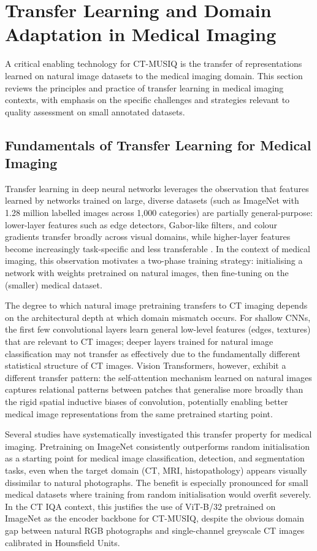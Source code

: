 \section{Transfer Learning and Domain Adaptation in Medical Imaging}
\label{sec:lit_transfer}

A critical enabling technology for CT-MUSIQ is the transfer of representations learned
on natural image datasets to the medical imaging domain. This section reviews the
principles and practice of transfer learning in medical imaging contexts, with emphasis
on the specific challenges and strategies relevant to quality assessment on small
annotated datasets.

\subsection{Fundamentals of Transfer Learning for Medical Imaging}

Transfer learning in deep neural networks leverages the observation that features learned
by networks trained on large, diverse datasets (such as ImageNet with 1.28 million
labelled images across 1,000 categories) are partially general-purpose: lower-layer
features such as edge detectors, Gabor-like filters, and colour gradients transfer broadly
across visual domains, while higher-layer features become increasingly task-specific and
less transferable \cite{goodfellow2016deep}. In the context of medical imaging, this
observation motivates a two-phase training strategy: initialising a network with
weights pretrained on natural images, then fine-tuning on the (smaller) medical dataset.

The degree to which natural image pretraining transfers to CT imaging depends on the
architectural depth at which domain mismatch occurs. For shallow CNNs, the first few
convolutional layers learn general low-level features (edges, textures) that are relevant
to CT images; deeper layers trained for natural image classification may not transfer
as effectively due to the fundamentally different statistical structure of CT images.
Vision Transformers, however, exhibit a different transfer pattern: the self-attention
mechanism learned on natural images captures relational patterns between patches that
generalise more broadly than the rigid spatial inductive biases of convolution,
potentially enabling better medical image representations from the same pretrained
starting point.

Several studies have systematically investigated this transfer property for medical
imaging. Pretraining on ImageNet consistently outperforms random initialisation as a
starting point for medical image classification, detection, and segmentation tasks, even
when the target domain (CT, MRI, histopathology) appears visually dissimilar to natural
photographs. The benefit is especially pronounced for small medical datasets where training
from random initialisation would overfit severely. In the CT IQA context, this
justifies the use of ViT-B/32 pretrained on ImageNet as the encoder backbone for
CT-MUSIQ, despite the obvious domain gap between natural RGB photographs and
single-channel greyscale CT images calibrated in Hounsfield Units.

